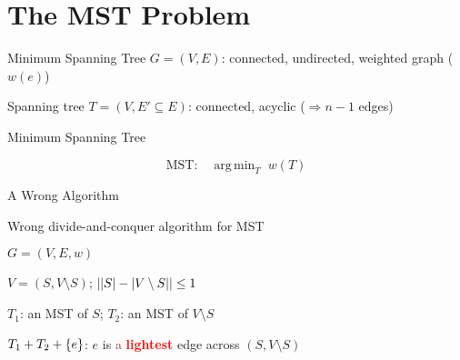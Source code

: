 \section{The MST Problem}	\label{section:mst-problem}

\begin{frame}{Minimum Spanning Tree}
  $G = (V, E)$: connected, undirected, weighted graph ($w(e)$)

  
  \pause
  \vspace{0.30cm}

  Spanning tree $T = (V, E' \subseteq E)$: connected, acyclic \pause ($\Rightarrow n-1$ edges)

  \vspace{0.20cm}
\end{frame}
\begin{frame}{Minimum Spanning Tree}

  \[
	\text{MST:} \quad \mathop{\mathrm{arg\,min}}_{T} \; w(T)
  \]

\end{frame}
\begin{frame}{A Wrong Algorithm}
  \begin{exampleblock}{Wrong divide-and-conquer algorithm for MST}
    \begin{description}
	  \item[Input:] $G = (V, E, w)$
	  \item[Divide:] $V = (S, V \setminus S)$; $\large| |S| - |V \setminus S| \large| \le 1$ \uncover<2->{\textcolor{red}{(Cut)}}
	  \item<3->[Conquer:] $T_1$: an MST of $S$; $T_2$: an MST of $V \setminus S$
	  \item<4->[Combine:] $T_{1} + T_{2} + \{e\}$: $e$ is \textcolor{brown}{a} \textcolor{red}{\bf lightest} edge across $(S, V \setminus S)$
    \end{description}
  \end{exampleblock}

  \pause
  \vspace{0.50cm}

\end{frame}
